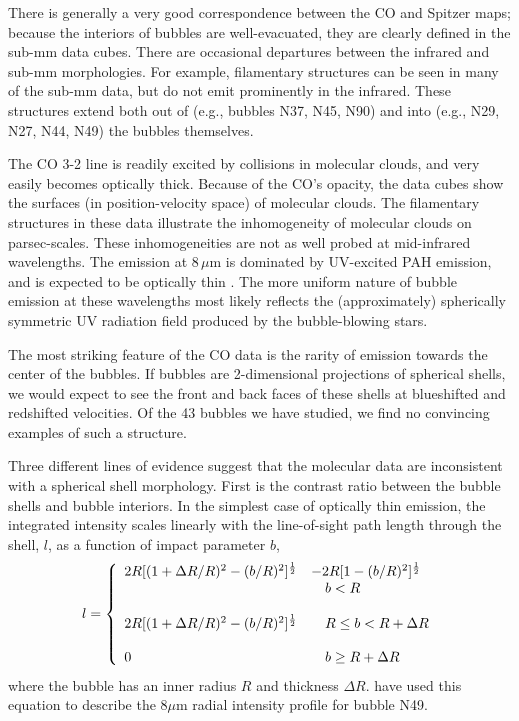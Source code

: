 There is generally a very good correspondence between the
CO and Spitzer maps; because the interiors of bubbles are well-evacuated,
they are clearly defined in the sub-mm data cubes. There are occasional
departures between the infrared and sub-mm morphologies. For example,
filamentary structures can be seen in many of the sub-mm data, but do not
emit prominently in the infrared. These structures extend both out of
(e.g., bubbles N37, N45, N90) and into
(e.g., N29, N27, N44, N49) the bubbles themselves.

The CO 3-2 line is readily excited by collisions in molecular clouds,
and very easily becomes optically thick. Because of the CO's opacity,
the \jcmt data cubes show the surfaces (in position-velocity space) of
molecular clouds. The filamentary structures in these data illustrate the inhomogeneity
of molecular clouds on parsec-scales. These inhomogeneities are not as well probed
at mid-infrared wavelengths. The emission at $8\, \mu$m is dominated by
UV-excited PAH emission, and is expected to be optically thin
\citep{Churchwell06, Watson08}. The more uniform nature of bubble emission at
these wavelengths most likely reflects the (approximately) spherically symmetric
UV radiation field produced by the bubble-blowing stars.

The most striking feature of the CO data is the rarity of emission towards
the center of the bubbles. If bubbles are 2-dimensional projections
of spherical shells, we would expect to see the front and back faces of these
shells at blueshifted and redshifted velocities. Of the 43 bubbles we have studied,
we find no convincing examples of such a structure.

Three different lines of evidence suggest that the molecular data are inconsistent
with a spherical shell morphology. First is the contrast ratio between the bubble shells
and bubble interiors. In the simplest case of optically thin emission, the integrated intensity
scales linearly with the line-of-sight path length
through the shell, $l$, as a function of impact parameter $b$,
\begin{equation}
\label{eq:othin}
l = \left\{
\begin{array}{l l}
   2R[(1 + \Delta R/R)^{2} - (b/R)^{2}]^{\frac{1}{2}}&  - 2R[1 - (b/R)^{2}]^{\frac{1}{2}} \\
    & \quad \mbox{$b < R $}  \\
	\\
   2R[(1 + \Delta R/R)^{2} - (b/R)^{2}]^{\frac{1}{2}} & \quad \mbox{$R \leq b < R + \Delta R$}\\
   \\
   0 &\quad \mbox{$b \geq R + \Delta R$}
\end{array} \right.
\end{equation}
where the bubble has an inner radius $R$ and thickness $\Delta R$.  have
used this equation to describe the $8 \mu$m radial intensity profile for bubble N49.

